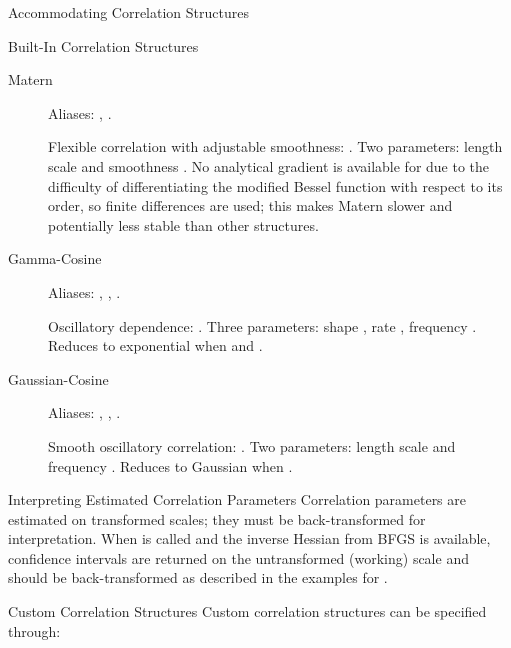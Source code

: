 \begin{Section}{Accommodating Correlation Structures}
\begin{SubSection}{Built-In Correlation Structures}
\begin{description}
\item[Matern] 
Aliases: , .

Flexible correlation with adjustable smoothness:
.
Two parameters: length scale  and smoothness
. No analytical gradient is available for
\eqn{\nu}{} due to the difficulty of differentiating the modified Bessel
function  with respect to its order, so finite differences
are used; this makes Matern slower and potentially less stable than
other structures.

\item[Gamma-Cosine] 
Aliases: , ,
.

Oscillatory dependence:
.
Three parameters: shape , rate
, frequency .
Reduces to exponential when  and .

\item[Gaussian-Cosine] 
Aliases: , ,
.

Smooth oscillatory correlation:
.
Two parameters: length scale  and frequency
. Reduces to Gaussian when
.


\end{description}

\end{SubSection}


%
\begin{SubSection}{Interpreting Estimated Correlation Parameters}
Correlation parameters are estimated on transformed scales; they must be
back-transformed for interpretation. When  is called and the
inverse Hessian from BFGS is available, confidence intervals are returned
on the untransformed (working) scale and should be back-transformed as
described in the examples for .
\end{SubSection}


%
\begin{SubSection}{Custom Correlation Structures}
Custom correlation structures can be specified through:
\begin{itemize}


\end{itemize}
\end{SubSection}
\end{Section}
